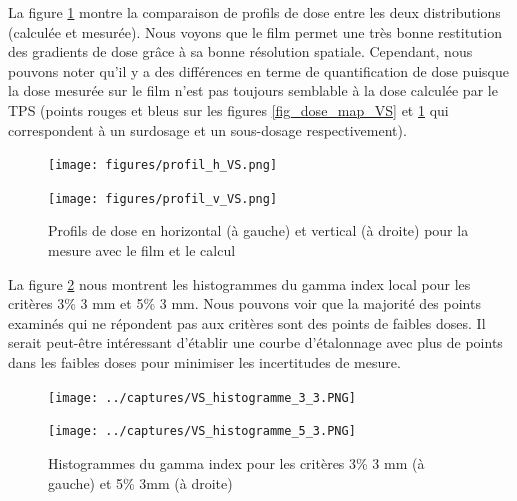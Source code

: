 \documentclass{book}
\begin{document}
La figure \ref*{fig_profil_h_v_VS} montre la comparaison de profils de dose entre les deux distributions (calculée et mesurée). Nous voyons que le film permet une très bonne restitution des gradients de dose grâce à sa bonne résolution spatiale. Cependant, nous pouvons noter qu'il y a des différences en terme de quantification de dose puisque la dose mesurée sur le film n'est pas toujours semblable à la dose calculée par le TPS (points rouges et bleus sur les figures \ref*{fig_dose_map_VS} et \ref*{fig_profil_h_v_VS} qui correspondent à un surdosage et un sous-dosage respectivement).

\begin{figure}[h]
  \centering
  \begin{minipage}{.45\linewidth}
    \texttt{[image: figures/profil\_h\_VS.png]}
  \end{minipage}
  \begin{minipage}{.45\linewidth}
    \texttt{[image: figures/profil\_v\_VS.png]}
  \end{minipage}
  \caption{Profils de dose en horizontal (à gauche) et vertical (à droite) pour la mesure avec le film et le calcul}
  \label{fig_profil_h_v_VS}
\end{figure}

La figure \ref*{fig_histo} nous montrent les histogrammes du gamma index local pour les critères 3\% 3 mm et 5\% 3 mm. Nous pouvons voir que la majorité des points examinés qui ne répondent pas aux critères sont des points de faibles doses. Il serait peut-être intéressant d'établir une courbe d'étalonnage avec plus de points dans les faibles doses pour minimiser les incertitudes de mesure.

\begin{figure}[h]
  \centering
  \begin{minipage}{.4\linewidth}
    \texttt{[image: ../captures/VS\_histogramme\_3\_3.PNG]}
  \end{minipage}
  \begin{minipage}{.4\linewidth}
    \texttt{[image: ../captures/VS\_histogramme\_5\_3.PNG]}
  \end{minipage}
  \caption{Histogrammes du gamma index pour les critères 3\% 3 mm (à gauche) et 5\% 3mm (à droite)}
  \label{fig_histo}
\end{figure}

  
\end{document}
